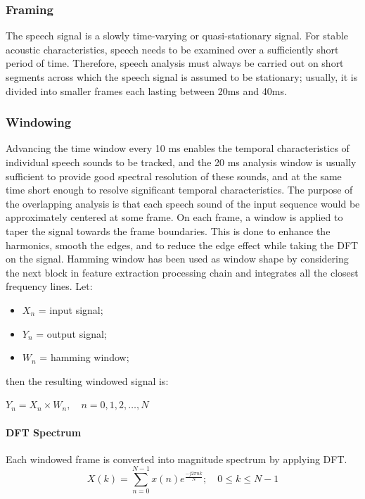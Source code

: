 \subsubsection{Framing}
The speech signal is a slowly time-varying or quasi-stationary signal. For stable acoustic characteristics, speech needs to be examined over a sufficiently short period of time. Therefore, speech analysis must always be carried out on short segments across which the speech signal is assumed to be stationary; usually, it is divided into smaller frames each lasting between 20ms and 40ms.

\subsubsection{Windowing}
Advancing the time window every 10 ms enables the temporal characteristics of individual speech sounds to be tracked, and the 20 ms analysis window is usually sufficient to provide good spectral resolution of these sounds, and at the same time short enough to resolve significant temporal characteristics. The purpose of the overlapping analysis is that each speech sound of the input sequence would be approximately centered at some frame. On each frame, a window is applied to taper the signal towards the frame boundaries. This is done to enhance the harmonics, smooth the edges, and to reduce the edge effect while taking the DFT on the signal.
Hamming window has been used as window shape by considering the next block in feature extraction processing chain and integrates all the closest frequency lines. Let:
\begin{itemize}
    \item $X_n$ = input signal;
    \item $Y_n$ = output signal;
    \item $W_n$ = hamming window;
\end{itemize}
then the resulting windowed signal is:
\begin{center}
$Y_n = X_n \times W_n, \quad n=0,1,2,\ldots,N$
\end{center}

\paragraph{DFT Spectrum}
Each windowed frame is converted into magnitude spectrum by applying DFT.
$$
X(k)=\sum_{n=0}^{N-1} x(n) e^{\frac{-j 2 \pi n k}{N}} ; \quad 0 \leq k \leq N-1
$$

